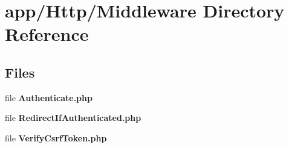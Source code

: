 \section{app/\+Http/\+Middleware Directory Reference}
\label{dir_ec66e20bd58bb36140a127a3e7a99e88}
\subsection*{Files}
\begin{DoxyCompactItemize}
\item 
file {\bf Authenticate.\+php}
\item 
file {\bf Redirect\+If\+Authenticated.\+php}
\item 
file {\bf Verify\+Csrf\+Token.\+php}
\end{DoxyCompactItemize}
